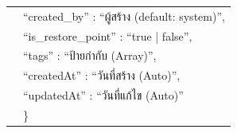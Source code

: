 \begin{table}[H]
\begin{tabularx}{\textwidth}{|l|L|}
                        & \hspace{1em} ``created\_by'' : ``ผู้สร้าง (default: system)'', \nonumber \\
                        & \hspace{1em} ``is\_restore\_point'' : ``true | false'', \nonumber \\
                        & \hspace{1em} ``tags'' : ``ป้ายกำกับ (Array)'', \nonumber \\
                        & \hspace{1em} ``createdAt'' : ``วันที่สร้าง (Auto)'', \nonumber \\
                        & \hspace{1em} ``updatedAt'' : ``วันที่แก้ไข (Auto)'' \nonumber \\
                        & \} \\
        \hline
    \end{tabularx}
\end{table}


